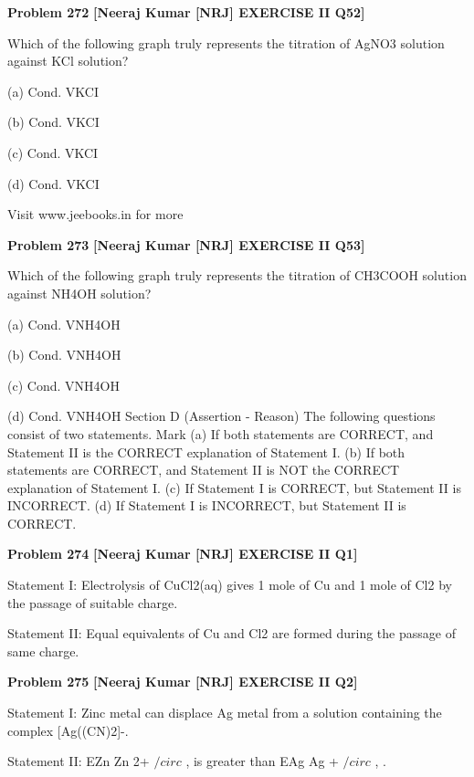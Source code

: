 \begin{problembox}
\textbf{Problem 272} \hfill \textbf{[Neeraj Kumar [NRJ] EXERCISE II Q52]}
\label{q:ext-nrj_all_questions-272}

Which of the following graph truly represents 
the titration of AgNO3 solution against KCl 
solution?
 
 (a) 
Cond.
VKCI
 
 (b) 
Cond.
VKCI
 
 (c) 
Cond.
VKCI
 
 (d) 
Cond.
VKCI
 
 
Visit www.jeebooks.in for more
\end{problembox}

\begin{problembox}
\textbf{Problem 273} \hfill \textbf{[Neeraj Kumar [NRJ] EXERCISE II Q53]}
\label{q:ext-nrj_all_questions-273}

Which of the following graph truly represents the 
titration of CH3COOH solution against NH4OH 
solution?
 
 (a) 
Cond.
VNH4OH
 
 (b) 
Cond.
VNH4OH
 
 (c) 
Cond.
VNH4OH
 
 (d) 
Cond.
VNH4OH
Section D (Assertion - Reason)
The following questions consist of two statements. Mark
 (a) If both statements are CORRECT, and Statement 
II is the CORRECT explanation of Statement I. 
 (b) If both statements are CORRECT, and Statement 
II is NOT the CORRECT explanation of 
Statement I. 
 (c) If Statement I is CORRECT, but  Statement II is 
INCORRECT. 
 (d) If Statement I is INCORRECT, but Statement II 
is CORRECT.
\end{problembox}

\begin{problembox}
\textbf{Problem 274} \hfill \textbf{[Neeraj Kumar [NRJ] EXERCISE II Q1]}
\label{q:ext-nrj_all_questions-274}

Statement I: Electrolysis of CuCl2(aq) gives 1 mole 
of Cu and 1 mole of Cl2 by the passage of suitable 
charge.
 
 Statement II: Equal equivalents of Cu and Cl2 are 
formed during the passage of same charge.
\end{problembox}

\begin{problembox}
\textbf{Problem 275} \hfill \textbf{[Neeraj Kumar [NRJ] EXERCISE II Q2]}
\label{q:ext-nrj_all_questions-275}

Statement I: Zinc metal can displace Ag metal from 
a solution containing the complex [Ag((CN)2]-.
 
 Statement II: EZn
Zn
2+
$/circ$
,
 is greater than EAg
Ag
+
$/circ$
,
.
\end{problembox}

